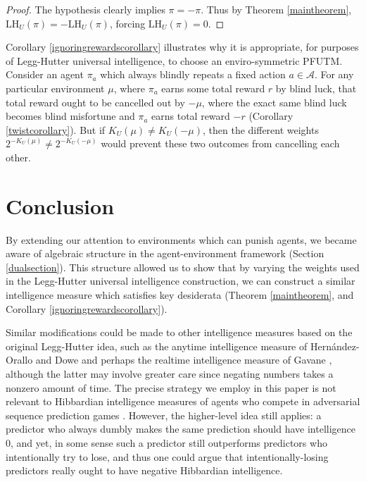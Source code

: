 \documentclass{article}
\def\LH{\textrm{LH}}
\def\SYM{S}
\begin{document}
\begin{proof}
    The hypothesis clearly implies $\pi=-\pi$. Thus by Theorem
    \ref{maintheorem}, $\LH_U(\pi)=-\LH_U(\pi)$,
    forcing $\LH_U(\pi)=0$.
\end{proof}

Corollary \ref{ignoringrewardscorollary} illustrates why it is appropriate, for
purposes of Legg-Hutter universal intelligence, to choose an enviro-symmetric PFUTM.
Consider an agent $\pi_a$
which always blindly repeats a fixed action $a\in\mathcal A$.
For any particular environment $\mu$,
where $\pi_a$ earns some total reward $r$ by blind luck,
that total reward ought to be cancelled out by $-\mu$, where
the exact same blind luck becomes blind misfortune and $\pi_a$ earns total reward
$-r$ (Corollary \ref{twistcorollary}). But if $K_U(\mu)\not=K_U(-\mu)$,
then the different weights $2^{-K_U(\mu)}\not=2^{-K_U(-\mu)}$ would prevent
these two outcomes from cancelling each other.


\section{Conclusion}
\label{conclusionsecn}

By extending our attention to environments which can punish agents,
we became aware of algebraic structure in the agent-environment
framework (Section \ref{dualsection}). This structure allowed us to
show that by varying the weights used in the Legg-Hutter universal
intelligence construction, we can construct a similar intelligence
measure which satisfies key desiderata (Theorem \ref{maintheorem},
and Corollary \ref{ignoringrewardscorollary}).

Similar modifications could be made to other intelligence
measures based on the original Legg-Hutter idea, such as the anytime
intelligence measure of Hern{\'a}ndez-Orallo and Dowe \cite{hernandez}
and perhaps the realtime intelligence measure of Gavane \cite{gavane},
although the latter may involve greater care since negating numbers
takes a nonzero amount of time. The precise strategy we employ in this
paper is not relevant to Hibbardian intelligence measures of agents
who compete in adversarial sequence prediction games
\cite{hibbard} \cite{alexander2021measuring}. However, the higher-level
idea still applies: a predictor who always dumbly
makes the same prediction should have intelligence $0$, and yet, in some sense
such a predictor still outperforms predictors who intentionally try
to lose, and thus one could argue that intentionally-losing predictors
really ought to have negative Hibbardian intelligence.
\end{document}
